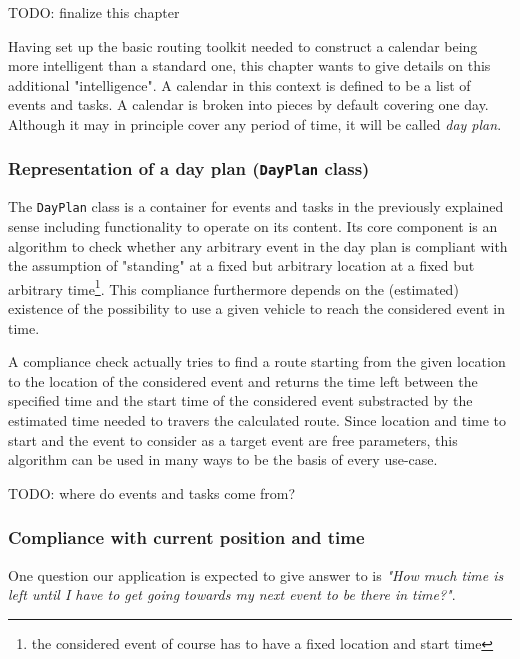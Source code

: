 TODO: finalize this chapter\newline

Having set up the basic routing toolkit needed to construct a calendar being more intelligent than a standard one, this chapter wants to give details on this additional "intelligence". A calendar in this context is defined to be a list of events and tasks. A calendar is broken into pieces by default covering one day. Although it may in principle cover any period of time, it will be called \emph{day plan}.

\subsubsection{Representation of a day plan (\texttt{DayPlan} class)}

The \texttt{DayPlan} class is a container for events and tasks in the previously explained sense including functionality to operate on its content. Its core component is an algorithm to check whether any arbitrary event in the day plan is compliant with the assumption of "standing" at a fixed but arbitrary location at a fixed but arbitrary time\footnote{the considered event of course has to have a fixed location and start time}. This compliance furthermore depends on the (estimated) existence of the possibility to use a given vehicle to reach the considered event in time.\newline

A compliance check actually tries to find a route starting from the given location to the location of the considered event and returns the time left between the specified time and the start time of the considered event substracted by the estimated time needed to travers the calculated route. Since location and time to start and the event to consider as a target event are free parameters, this algorithm can be used in many ways to be the basis of every use-case.\newline

TODO: where do events and tasks come from?

\subsubsection{Compliance with current position and time}
 
One question our application is expected to give answer to is \emph{"How much time is left until I have to get going towards my next event to be there in time?"}.\newline

